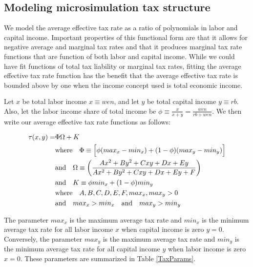 \documentclass[letterpaper,12pt]{article}
\theoremstyle{definition}
\begin{document}
\begin{spacing}{1.5}
  \subsection{Modeling microsimulation tax structure}\label{SecIntegrMicrosim}


We model the average effective tax rate as a ratio of polynomials in labor and capital income.  Important properties of this functional form are that it allows for negative average and marginal tax rates and that it produces marginal tax rate functions that are function of both labor and capital income.  While we could have fit functions of total tax liability or marginal tax rates, fitting the average effective tax rate function has the benefit that the average effective tax rate is bounded above by one when the income concept used is total economic income.

    Let $x$ be total labor income $x\equiv wen$, and let $y$ be total capital income $y\equiv rb$. Also, let the labor income share of total income be $\phi\equiv\frac{x}{x+y}=\frac{wen}{rb + wen}$.  We then write our average effective tax rate functions as follows:

    \begin{equation}\label{EqATR}
      \begin{split}
        \tau(x,y) = &\Phi\Omega + K \\
        &\text{where}\quad \Phi \equiv \Bigl[\phi(max_x - min_x) + (1 - \phi)(max_y - min_y)\Bigr] \\
        &\text{and}\quad \Omega \equiv \biggl(\frac{Ax^2 + By^2 + Cxy + Dx + Ey}{Ax^2 + By^2 + Cxy + Dx + Ey + F}\biggr) \\
        &\text{and}\quad K \equiv \phi min_x + (1 - \phi)min_y \\
        &\text{where}\quad A,B,C,D,E,F,max_x,max_y > 0 \\
        &\text{and}\quad max_x > min_x \quad\text{and}\quad max_y > min_y
      \end{split}
    \end{equation}

    The parameter $max_x$ is the maximum average tax rate and $min_x$ is the minimum average tax rate for all labor income $x$ when capital income is zero $y=0$. Conversely, the parameter $max_y$ is the maximum average tax rate and $min_y$ is the minimum average tax rate for all capital income $y$ when labor income is zero $x=0$. These parameters are summarized in Table \ref{TaxParams}.



\end{spacing}
\end{document}
